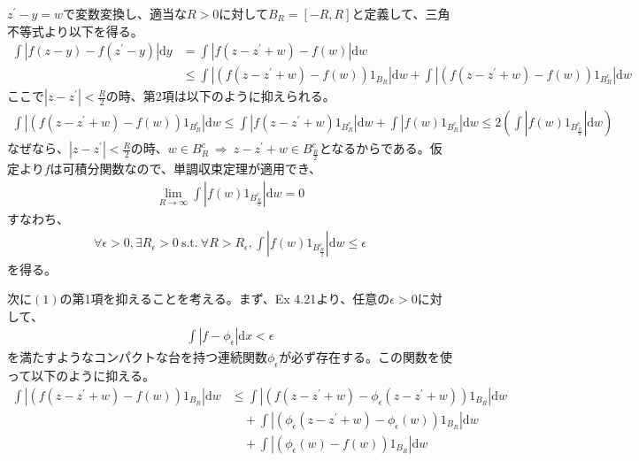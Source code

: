 \documentclass{article}
\begin{document}
$z^{\prime} - y = w$で変数変換し、適当な$R > 0$に対して$B_R = [-R, R]$と定義して、三角不等式より以下を得る。
\begin{align}
	\int \left| f(z-y) - f(z^{\prime} -y) \right| \mathrm{d}y &= \int \left| f(z-z^{\prime}+w) - f(w) \right| \mathrm{d}w \nonumber \\[8pt]
	&\leq \int \left| \left( f(z-z^{\prime}+w) - f(w)\right) 1_{B_R} \right| \mathrm{d}w + \int \left| \left( f(z-z^{\prime}+w) - f(w)\right) 1_{B_R^c} \right| \mathrm{d}w
\end{align}
ここで$\left| z-z^{\prime} \right| < \frac{R}{2}$の時、第2項は以下のように抑えられる。
\begin{align*}
	\int \left| \left( f(z-z^{\prime}+w) - f(w)\right) 1_{B_R^c} \right| \mathrm{d}w \leq \int \left| f(z-z^{\prime}+w)1_{B_R^c} \right| \mathrm{d}w + \int \left| f(w)1_{B_R^c} \right| \mathrm{d}w \leq 2\left( \int \left| f(w)1_{B_{\frac{R}{2}}^c} \right| \mathrm{d}w \right)
\end{align*}
なぜなら、$\left| z-z^{\prime} \right| < \frac{R}{2}$の時、$w \in B_R^c\ \Rightarrow\ z-z^{\prime}+w \in B_{\frac{R}{2}}^c$となるからである。仮定より$f$は可積分関数なので、単調収束定理が適用でき、
\begin{align*}
	\lim_{R\to \infty} \int \left| f(w)1_{B_{\frac{R}{2}}^c} \right| \mathrm{d}w = 0
\end{align*}
すなわち、
\begin{align}
	\forall \epsilon > 0, \exists R_{\epsilon} > 0\ \text{s.t.}\ \forall R> R_{\epsilon},  \int \left| f(w)1_{B_{\frac{R}{2}}^c} \right| \mathrm{d}w \leq \epsilon
\end{align}
を得る。

次に$(1)$の第1項を抑えることを考える。まず、Ex 4.21より、任意の$\epsilon > 0$に対して、
\begin{align*}
	\int \left| f- \phi_{\epsilon} \right| \mathrm{d}x < \epsilon
\end{align*}
を満たすようなコンパクトな台を持つ連続関数$\phi_{\epsilon}$が必ず存在する。この関数を使って以下のように抑える。
\begin{align*}
	\int \left| \left( f(z-z^{\prime}+w) - f(w)\right) 1_{B_R} \right| \mathrm{d}w &\leq \int \left| \left( f(z-z^{\prime} +w) - \phi_{\epsilon}(z-z^{\prime} +w) \right)1_{B_R} \right| \mathrm{d}w \\&\quad +  \int \left| \left( \phi_{\epsilon}(z-z^{\prime} +w) - \phi_{\epsilon}(w) \right)1_{B_R} \right| \mathrm{d}w\\ &\quad +  \int \left| \left( \phi_{\epsilon}(w) - f(w) \right)1_{B_R} \right| \mathrm{d}w
\end{align*}
\end{document}
